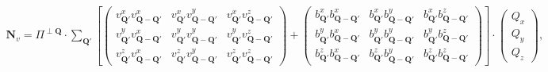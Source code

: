 \documentclass[prb,singlecolumn]{revtex4}
\begin{document}
\begin{eqnarray}
\mathbf{N}_v  = \Pi^{\perp\mathbf{Q}}\cdot\sum_{\mathbf{Q}'}
\left[
\left(\begin{array}{ccc}
v_{\mathbf{Q}'}^xv_{\mathbf{Q}-\mathbf{Q}'}^x & v_{\mathbf{Q}'}^xv_{\mathbf{Q}-\mathbf{Q}'}^y & v_{\mathbf{Q}'}^xv_{\mathbf{Q}-\mathbf{Q}'}^z \\
v_{\mathbf{Q}'}^yv_{\mathbf{Q}-\mathbf{Q}'}^x & v_{\mathbf{Q}'}^yv_{\mathbf{Q}-\mathbf{Q}'}^y & v_{\mathbf{Q}'}^yv_{\mathbf{Q}-\mathbf{Q}'}^z \\
v_{\mathbf{Q}'}^zv_{\mathbf{Q}-\mathbf{Q}'}^x & v_{\mathbf{Q}'}^zv_{\mathbf{Q}-\mathbf{Q}'}^y & v_{\mathbf{Q}'}^zv_{\mathbf{Q}-\mathbf{Q}'}^z
\end{array} \right)
+
\left(\begin{array}{ccc}
b_{\mathbf{Q}'}^xb_{\mathbf{Q}-\mathbf{Q}'}^x & b_{\mathbf{Q}'}^xb_{\mathbf{Q}-\mathbf{Q}'}^y & b_{\mathbf{Q}'}^xb_{\mathbf{Q}-\mathbf{Q}'}^z \\
b_{\mathbf{Q}'}^yb_{\mathbf{Q}-\mathbf{Q}'}^x & b_{\mathbf{Q}'}^yb_{\mathbf{Q}-\mathbf{Q}'}^y & b_{\mathbf{Q}'}^yb_{\mathbf{Q}-\mathbf{Q}'}^z \\
b_{\mathbf{Q}'}^zb_{\mathbf{Q}-\mathbf{Q}'}^x & b_{\mathbf{Q}'}^zb_{\mathbf{Q}-\mathbf{Q}'}^y & b_{\mathbf{Q}'}^zb_{\mathbf{Q}-\mathbf{Q}'}^z
\end{array} \right)
\right]
\cdot
\left(\begin{array}{c}
Q_x \\
Q_y \\
Q_z
\end{array} \right),
\end{eqnarray}
\end{document}
